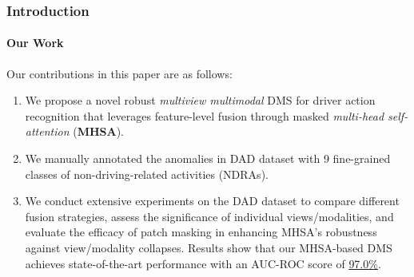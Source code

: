 \begin{frame}
\frametitle{Introduction}
\framesubtitle{Our Work}
    Our contributions in this paper are as follows:
    \begin{enumerate}
        \item We propose a novel robust \textit{multiview multimodal} DMS for driver action recognition that leverages feature-level fusion through masked \textit{multi-head self-attention} (\textbf{MHSA}).
        \item We manually annotated the anomalies in DAD dataset with 9 fine-grained classes of non-driving-related activities (NDRAs).
        \item We conduct extensive experiments on the DAD dataset to compare different fusion strategies, assess the significance of individual views/modalities, and evaluate the efficacy of patch masking in enhancing MHSA's robustness against view/modality collapses. Results show that our MHSA-based DMS achieves state-of-the-art performance with an AUC-ROC score of \underline{97.0\%}. 
    \end{enumerate}
\end{frame}